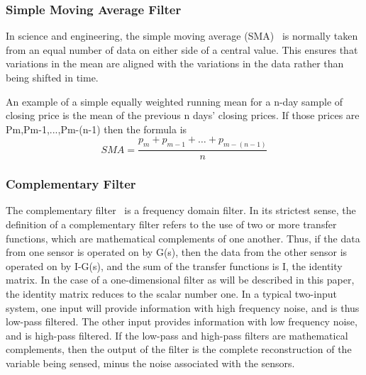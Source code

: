 \subsubsection{Simple Moving Average Filter}\label{sma-filter}
In science and engineering, the simple moving average (SMA)~\cite{wiki-sma} is normally taken from an equal number of data on either side of a central value. This ensures that variations in the mean are aligned with the variations in the data rather than being shifted in time.

An example of a simple equally weighted running mean for a n-day sample of closing price is the mean of the previous n days' closing prices. If those prices are Pm,Pm-1,...,Pm-(n-1) then the formula is
\[SMA = \frac{{{p_m} + {p_{m - 1}} +  \ldots  + {p_{m - (n - 1)}}}}{n}\]

\subsubsection{Complementary Filter}\label{complementary-filter}
The complementary filter~\cite{complementary-filter} is a frequency domain filter. In its strictest sense, the definition of a complementary filter refers to the use of two or more transfer functions, which are mathematical complements of one another. Thus, if the data from one sensor is operated on by G(s), then the data from the other sensor is operated on by I-G(s), and the sum of
the transfer functions is I, the identity matrix. In the case of a one-dimensional filter as will be described in this paper, the identity matrix reduces to the scalar number one.
In a typical two-input system, one input will provide information with high frequency noise, and is thus low-pass filtered. The other input provides information with low frequency noise, and is high-pass filtered. If the low-pass and high-pass filters are mathematical complements, then the output of the filter is the complete reconstruction of the variable being sensed, minus the noise associated with the sensors. 